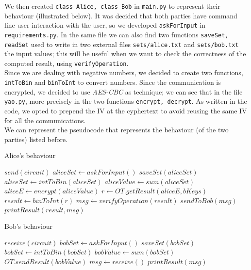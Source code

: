 \documentclass[12pt]{article}
\newcommand{\inlinecode}{\texttt}
\begin{document}
We then created \inlinecode{class Alice, class Bob} in \inlinecode{main.py} to represent their behaviour (illustrated below).
It was decided that both parties have command line user interaction with the user, so we developed \inlinecode{askForInput} in \inlinecode{requirements.py}. In the same file we can also find two functions \inlinecode{saveSet, readSet} used to write in two external files \inlinecode{sets/alice.txt} and \inlinecode{sets/bob.txt} the input values; this will be useful when we want to check the correctness of the computed result, using \inlinecode{verifyOperation}.\\ Since we are dealing with negative numbers, we decided to create two functions, \inlinecode{intToBin} and \inlinecode{binToInt} to convert numbers. Since the communication is encrypted, we decided to use \textit{AES-CBC} as technique; we can see that in the file \inlinecode{yao.py}, more precisely in the two functions \inlinecode{encrypt, decrypt}. As written in the code, we opted to prepend the IV at the cyphertext to avoid reusing the same IV for all the communications.\\
We can represent the pseudocode that represents the behaviour (of the two parties) listed before.\\

\begin{minipage}{0.46\textwidth}
    \begin{algorithm}[H]
        \centering
        \caption{Alice's behaviour}\label{alice:algo}
        \begin{algorithmic}[1]
            \State $send(circuit)$  
            \State $aliceSet \gets askForInput()$ 
            \State $saveSet(aliceSet)$ 
            \State $aliceSet \gets intToBin(aliceSet)$ 
            \State
            \State $aliceValue \gets sum(aliceSet)$
            \State $aliceE \gets encrypt(aliceValue)$
            \State
            \State $r \gets OT.getResult(aliceE,bKeys)$
            \State
            \State $result \gets binToInt(r)$
            \State $msg \gets verifyOperation(result)$ 
            \State $sendToBob(msg)$
            \State $printResult(result,msg)$

        \end{algorithmic}
    \end{algorithm}
    \end{minipage}
    \hfill
    \begin{minipage}{0.46\textwidth}
    \begin{algorithm}[H]
        \centering
        \caption{Bob's behaviour}\label{bob:algo}
        \begin{algorithmic}[1]
            \State $receive(circuit)$  
            \State $bobSet \gets askForInput()$ 
            \State $saveSet(bobSet)$ 
            \State $bobSet \gets intToBin(bobSet)$ 
            \State
            \State $bobValue \gets sum(bobSet)$
            \State
            \State $OT.sendResult(bobValue)$
            \State
            \State $msg \gets receive()$
            \State $printResult(msg)$

        \end{algorithmic}
    \end{algorithm}
    \end{minipage}
\clearpage
\end{document}
